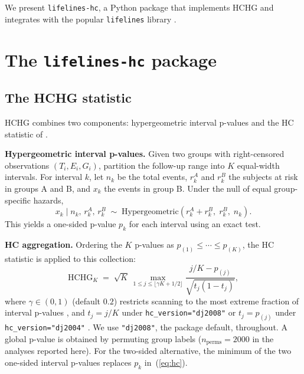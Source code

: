 \documentclass[unnumsec,webpdf,contemporary,large]{oup-authoring-template}
\begin{document}
We present \texttt{lifelines-hc}, a Python package that implements HCHG and integrates with the popular \texttt{lifelines} library \citep{davidsonpilon2019}.


\section{The \texttt{lifelines-hc} package}

\subsection*{The HCHG statistic}

HCHG \citep{kipnis_biometrika} combines two components: hypergeometric
interval p-values and the HC statistic of \citet{donoho2004,donoho2015special}.

\textbf{Hypergeometric interval p-values.}
Given two groups with right-censored observations $(T_i, E_i, G_i)$,
partition the follow-up range into $K$ equal-width intervals. For
interval $k$, let $n_k$ be the total events, $r_k^A$ and $r_k^B$ the
subjects at risk in groups A and B, and $x_k$ the events in group B.
Under the null of equal group-specific hazards,
%
\begin{equation}\label{eq:hypergeom}
  x_k \;\Big|\; n_k,\, r_k^A,\, r_k^B
  \;\sim\;
  \mathrm{Hypergeometric}\!\left(r_k^A + r_k^B,\; r_k^B,\; n_k\right).
\end{equation}
%
This yields a one-sided p-value $p_k$ for each interval using an exact test.

\textbf{HC aggregation.}
Ordering the $K$ p-values as $p_{(1)} \leq \cdots \leq p_{(K)}$, the
HC statistic \citep{donoho2004,donoho2015special} is applied to this collection:
%
\begin{equation}\label{eq:hc}
  \mathrm{HCHG}_K
  \;=\;
  \sqrt{K}\,
  \max_{1 \leq j \leq \lfloor\gamma K + 1/2\rfloor}
  \frac{j/K - p_{(j)}}{\sqrt{t_j\!\left(1 - t_j\right)}},
\end{equation}
%
where $\gamma \in (0,1)$ (default $0.2$) restricts scanning to the most
extreme fraction of interval p-values \citep{donoho2004,donoho2015special},
and $t_j = j/K$ under \texttt{hc\_version="dj2008"} \citep{donoho2008} or
$t_j = p_{(j)}$ under \texttt{hc\_version="dj2004"} \citep{donoho2004}. We
use \texttt{"dj2008"}, the package default, throughout.
A global p-value is obtained by permuting group labels
($n_\mathrm{perms} = 2000$ in the analyses reported here). For the two-sided alternative,
the minimum of the two one-sided interval p-values replaces $p_k$
in~(\ref{eq:hc}).
\end{document}
